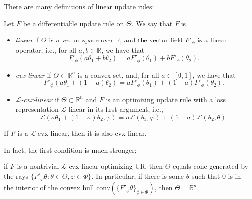 
There are many definitions of linear update rules:
\begin{defn}\label{ax:linear}
Let $F$ be a differentiable update rule on $\Theta$. We say that $F$ is \textellipsis
\begin{itemize}
\item \emph{linear} if $\Theta$ is a vector space over $\mathbb R$, and the
vector field $F'_\phi$ is a linear operator, i.e., for all $a, b \in \mathbb R$, we have that
\[ F'_\phi(a \theta_1 + b \theta_2) = a F'_\phi(\theta_1) + b F'_\phi(\theta_2). \]

\item \emph{cvx-linear} if $\Theta \subset \mathbb R^n$ is a convex set, and, for all $a \in [0,1]$, we have that
\[ F'_\phi(a \theta_1 + (1-a) \theta_2) = a F'_\phi(\theta_1) + (1-a) F'_\phi(\theta_2). \]

\item \emph{$\mathcal L$-cvx-linear} if $\Theta \subset \mathbb R^n$ and $F$ is an optimizing update rule with a loss representation $\mathcal L$ linear in its first argument, i.e.,
\[
    \mathcal L(a \theta_1 + (1-a) \theta_2, \varphi) = a \mathcal L(\theta_1, \varphi) + (1-a) \mathcal L(\theta_2, \theta).
\]
\end{itemize}
\end{defn}

\begin{prop}
If $F$ is a $\mathcal L$-cvx-linear, then it is also cvx-linear.
\end{prop}

In fact, the first condition is much stronger;
\begin{prop}
if $F$ is a nontrivial $\mathcal L$-cvx-linear optimizing UR, then $\Theta$ equals cone generated by  the rays $\{ F'_\varphi\theta : \theta \in \Theta, \varphi \in \Phi \}$. In particular, if there is some $\theta$ such that $0$ is in the interior of the convex hull $\mathrm{conv}(\{F'_\phi\theta\}_{\phi \in \Phi})$, then $\Theta = \mathbb R^n$.
\end{prop}



